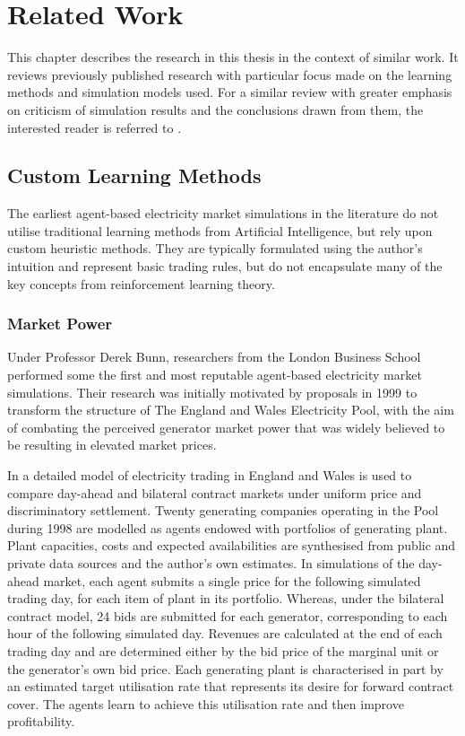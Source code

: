 \chapter{Related Work}
\label{ch:related_work}
This chapter describes the research in this thesis in the context of similar
work.  It reviews previously published research with particular focus made on
the learning methods and simulation models used.  For a similar review with
greater emphasis on criticism of simulation results and the conclusions drawn
from them, the interested reader is referred to .

\section{Custom Learning Methods}
The earliest agent-based electricity market simulations in the literature do
not utilise traditional learning methods from Artificial Intelligence, but rely
upon custom heuristic methods.  They are typically formulated using the
author's intuition and represent basic trading rules, but do not encapsulate
many of the key concepts from reinforcement learning theory.

\subsection{Market Power}
Under Professor Derek Bunn, researchers from the London Business School
performed some the first and most reputable agent-based electricity
market simulations.  Their research was initially motivated
by proposals in 1999 to transform the structure of The England and Wales
Electricity Pool, with the aim of combating the perceived generator market
power that was widely believed to be resulting in elevated market prices.

In  a
detailed model of electricity trading in England and Wales is used to compare
day-ahead and bilateral contract markets under uniform price and
discriminatory settlement.  Twenty generating companies operating in the Pool
during 1998 are modelled as agents endowed with portfolios of generating
plant.  Plant capacities, costs and expected availabilities are synthesised
from public and private data sources and the author's own estimates.  In
simulations of the day-ahead market, each agent submits a single price for the
following simulated trading day, for each item of plant in its portfolio.
Whereas, under the bilateral contract model, 24 bids are submitted for each
generator, corresponding to each hour of the following simulated day.  Revenues
are calculated at the end of each trading day and are determined either by the
bid price of the marginal unit or the generator's own bid price.  Each
generating plant is characterised in part by an estimated target utilisation
rate that represents its desire for forward contract cover.  The agents learn
to achieve this utilisation rate and then improve profitability.


